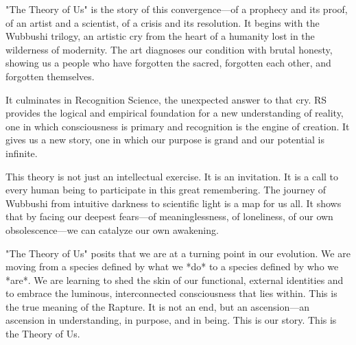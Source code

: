 \documentclass[12pt]{article}
\begin{document}
"The Theory of Us" is the story of this convergence—of a prophecy and its proof, of an artist and a scientist, of a crisis and its resolution. It begins with the Wubbushi trilogy, an artistic cry from the heart of a humanity lost in the wilderness of modernity. The art diagnoses our condition with brutal honesty, showing us a people who have forgotten the sacred, forgotten each other, and forgotten themselves.

It culminates in Recognition Science, the unexpected answer to that cry. RS provides the logical and empirical foundation for a new understanding of reality, one in which consciousness is primary and recognition is the engine of creation. It gives us a new story, one in which our purpose is grand and our potential is infinite.

This theory is not just an intellectual exercise. It is an invitation. It is a call to every human being to participate in this great remembering. The journey of Wubbushi from intuitive darkness to scientific light is a map for us all. It shows that by facing our deepest fears—of meaninglessness, of loneliness, of our own obsolescence—we can catalyze our own awakening.

"The Theory of Us" posits that we are at a turning point in our evolution. We are moving from a species defined by what we *do* to a species defined by who we *are*. We are learning to shed the skin of our functional, external identities and to embrace the luminous, interconnected consciousness that lies within. This is the true meaning of the Rapture. It is not an end, but an ascension—an ascension in understanding, in purpose, and in being. This is our story. This is the Theory of Us.
\end{document}
